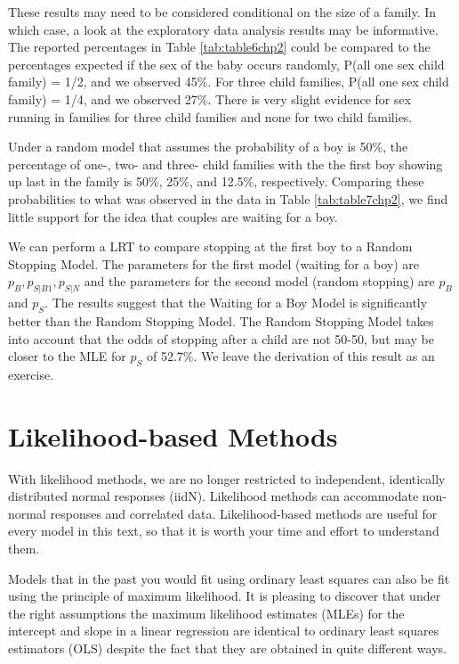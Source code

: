\documentclass[
]{krantz}
\newcommand{\bstop}{p_{S|B1}}
\newcommand{\nstop}{p_{S|N}}
\begin{document}
These results may need to be considered conditional on the size of a family. In which case, a look at the exploratory data analysis results may be informative. The reported percentages in Table \ref{tab:table6chp2} could be compared to the percentages expected if the sex of the baby occurs randomly, P(all one sex child family) = 1/2, and we observed 45\%. For three child families, P(all one sex child family) = 1/4, and we observed 27\%. There is very slight evidence for sex running in families for three child families and none for two child families.

Under a random model that assumes the probability of a boy is 50\%, the percentage of one-, two- and three- child families with the the first boy showing up last in the family is 50\%, 25\%, and 12.5\%, respectively. Comparing these probabilities to what was observed in the data in Table \ref{tab:table7chp2}, we find little support for the idea that couples are waiting for a boy.

We can perform a LRT to compare stopping at the first boy to a Random Stopping Model. The parameters for the first model (waiting for a boy) are \(p_B, \bstop, \nstop\) and the parameters for the second model (random stopping) are \(p_B\) and \(p_S\). The results suggest that the Waiting for a Boy Model is significantly better than the Random Stopping Model. The Random Stopping Model takes into account that the odds of stopping after a child are not 50-50, but may be closer to the MLE for \(p_S\) of 52.7\%. We leave the derivation of this result as an exercise.

\hypertarget{likelihood-based-methods}{%
\section{Likelihood-based Methods}\label{likelihood-based-methods}}

With likelihood methods, we are no longer restricted to independent, identically distributed normal responses (iidN). Likelihood methods can accommodate non-normal responses and correlated data. Likelihood-based methods are useful for every model in this text, so that it is worth your time and effort to understand them.

Models that in the past you would fit using ordinary least squares can also be fit using the principle of maximum likelihood. It is pleasing to discover that under the right assumptions the maximum likelihood estimates (MLEs) for the intercept and slope in a linear regression are identical to ordinary least squares estimators (OLS) despite the fact that they are obtained in quite different ways.
\end{document}
